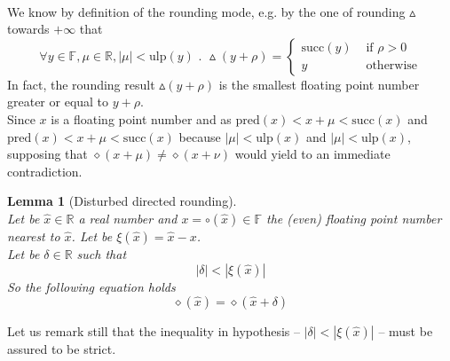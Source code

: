 \documentclass[a4paper,10pt,twoside]{article}
\newtheorem{lemma}[theorem]{Lemma}
\newenvironment{proof}[1][Proof]{\begin{trivlist}
\item[\hskip \labelsep {\bfseries #1}]}{\end{trivlist}}
\newcommand{\qed}{\nobreak \ifvmode \relax \else \ifdim \lastskip<1.5em \hskip-\lastskip
\hskip1.5em plus0em minus0.5em \fi \nobreak \vrule height0.75em width0.5em depth0.25em\fi}
\newcommand{\F}{\ensuremath{\mathbb {F}}}
\newcommand{\R}{\ensuremath{\mathbb {R}}}
\newcommand{\mUlp}{\ensuremath{\mathrm{ulp}}}
\renewcommand{\succ}{\ensuremath{\mathrm{succ}}}
\newcommand{\pred}{\ensuremath{\mathrm{pred}}}
\begin{document}
\begin{proof} ~ \\
We know by definition of the rounding mode, e.g. by the one of rounding $\vartriangle$ towards $+\infty$ that
$$\forall y \in \F, \mu \in \R, \left \vert \mu \right \vert < \mUlp\left( y \right) \mbox{ . }
\vartriangle \left( y + \rho \right) = \left \lbrace \begin{array}{ll}
\succ\left(y\right) & \mbox{ if } \rho > 0 \\
y & \mbox{ otherwise}
\end{array} \right. $$
In fact, the rounding result $\vartriangle\left( y + \rho \right)$ is the smallest floating point number greater or equal
to
$y + \rho$. \\
Since $x$ is a floating point number and as
$\pred\left( x \right) < x + \mu < \succ\left( x \right)$ and $\pred\left( x \right) < x + \mu < \succ\left( x \right)$
because $\left \vert \mu \right \vert < \mUlp\left( x \right)$ and $\left \vert \mu \right \vert < \mUlp\left( x \right)$,
supposing that $\diamond \left( x + \mu \right) \not = \diamond \left( x + \nu \right)$ would yield to an immediate contradiction.\qed
\end{proof}
\begin{lemma}[Disturbed directed rounding] \label{arrdirper} ~ \\
Let be $\hat{x} \in \R$ a real number and $x = \circ\left( \hat{x} \right) \in \F$ the (even) floating point number nearest to
$\hat{x}$.
Let be $\xi\left(\hat{x}\right) = \hat{x} - x$. \\
Let be $\delta \in \R$ such that
$$\left \vert \delta \right \vert < \left \vert \xi\left(\hat{x}\right) \right \vert$$
So the following equation holds
$$\diamond \left( \hat{x} \right) = \diamond \left( \hat{x} + \delta \right)$$
\end{lemma}
Let us remark still that the inequality in hypothesis
-- $\left \vert \delta \right \vert < \left \vert \xi\left( \hat{x} \right) \right \vert$ --
must be assured to be strict.
\end{document}
